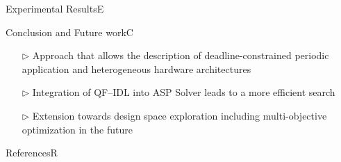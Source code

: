 \documentclass[final]{beamer} %
\newlength\colwidth
\renewcommand{\blacktriangleright}{\triangleright}
\begin{document}
\begin{frame}{}
\begin{columns}[T]
\begin{column}{\colwidth}
\begin{tcolorbox}[size=minimal,equal height group=S,colback=tlg,colframe=tlg,beforeafter skip=0.0cm,toptitle=0mm,bottomtitle=0mm]
\begin{myblock}{Experimental Results}{E}
\begin{center}
	  					\end{center}
  					\vspace*{-0.7cm}
	  				\end{myblock}
	  				\begin{myblock}{Conclusion and Future work}{C}
	  					\begin{itemize}
	  						\item[\color{HRO1}$\blacktriangleright$] Approach that allows the description of deadline-constrained periodic application and heterogeneous hardware architectures
	  						\item[\color{HRO1}$\blacktriangleright$] Integration of QF--IDL into ASP Solver leads to a more efficient search 
	  						\item[\color{HRO1}$\blacktriangleright$] Extension towards design space exploration including multi-objective optimization in the future
	  					\end{itemize}
	  				\end{myblock}
	  				\begin{myblock}{References}{R}
	  					\vspace*{-1cm}
	  					\small
						
	  					
	  				\end{myblock}
  				\end{tcolorbox}
  			\end{column}
  		\end{columns}
  	\end{frame}
  
\end{document}
